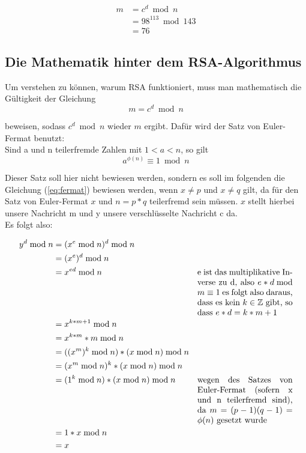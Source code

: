 \documentclass[12pt,a4paper]{scrartcl}
\begin{document}
	\begin{equation}
	\begin{split}
	m & = c^d \bmod n \\
	 &  = 98^{113} \bmod 143 \\
 	& = 76
	\end{split}
	\end{equation}

	\subsection{Die Mathematik hinter dem RSA-Algorithmus}
	Um verstehen zu können, warum RSA funktioniert, muss man mathematisch die Gültigkeit der Gleichung
	\begin{equation}\label{eq:fermat}
 m = c^d \bmod n
 \end{equation}

 beweisen, sodass $c^d \bmod n$ wieder $m$ ergibt. Dafür wird der Satz von Euler-Fermat benutzt: \\
	Sind a und n teilerfremde Zahlen mit $1 < a < n$, so gilt
	$$a^{\phi (n)} \equiv 1 \bmod n $$
	
	Dieser Satz soll hier nicht bewiesen werden, sondern es soll im folgenden die Gleichung (\ref{eq:fermat}) bewiesen werden, wenn $x \neq p$ und $x \neq q$ gilt, da für den Satz von Euler-Fermat $x$ und $n = p*q$ teilerfremd sein müssen. $x$ stellt hierbei unsere Nachricht m und y unsere verschlüsselte Nachricht c da. \\
	Es folgt also:
	
	\begin{align*}
	 y^d \bmod n & = (x^e \bmod n)^d \bmod n & \\
	 & = (x^e)^d \bmod n &\\
 	 & =x^{ed} \bmod n &  \parbox[t]{4cm}{e ist das multiplikative Inverse zu d, also $e * d \bmod m \equiv 1$ es folgt also daraus, dass es kein $k \in \mathbb{Z}$ gibt, so dass $e*d=k*m+1$}\\
 	 & =x^{k*m+1} \bmod n & \\
 	 & =x^{k*m}*m \bmod n & \\
 	 & =((x^m)^k \bmod n) * (x \bmod n) \bmod n & \\
 	 & =(x^m \bmod n)^k * (x \bmod n) \bmod n & \\
 	 & =(1^k \bmod n) * (x \bmod n) \bmod n &  \parbox[t]{4cm}{wegen des Satzes von Euler-Fermat (sofern x und n teilerfremd sind), da $m = (p - 1)(q - 1) = \phi(n)$ gesetzt wurde} \\
 	 & = 1 * x \bmod n & \\
 	 & = x &
 	\end{align*}
\end{document}
